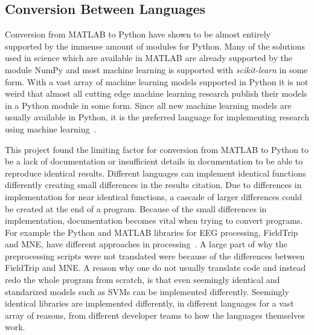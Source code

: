 \documentclass[12pt, a4paper]{article}
\begin{document}



\subsection{Conversion Between Languages}

Conversion from MATLAB to Python have shown to be almost entirely supported by the immense amount of modules for Python.
Many of the solutions used in science which are available in MATLAB are already supported by the module NumPy and most machine learning is supported with \textsl{scikit-learn} in some form.
With a vast array of machine learning models supported in Python it is not weird that almost all cutting edge machine learning research publish their models in a Python module in some form.
Since all new machine learning models are usually available in Python, it is the preferred language for implementing research using machine learning~\cite{Silaparasetty2020}.

This project found the limiting factor for conversion from MATLAB to Python to be a lack of documentation or insufficient details in documentation to be able to reproduce identical results.
Different languages can implement identical functions differently creating small differences in the results citation.
Due to differences in implementation for near identical functions, a cascade of larger differences could be created at the end of a program.
Because of the small differences in implementation, documentation becomes vital when trying to convert programs.
For example the Python and MATLAB libraries for EEG processing, FieldTrip and MNE, have different approaches in processing~\cite{MNEVersusFielder}.
A large part of why the preprocessing scripts were not translated were because of the differences between FieldTrip and MNE. 
A reason why one do not usually translate code and instead redo the whole program from scratch, is that even seemingly identical and standarized models such as SVMs can be implemented differently.
Seemingly identical libraries are implemented differently, in different languages for a vast array of reasons, from different developer teams to how the languages themselves work.
\end{document}
